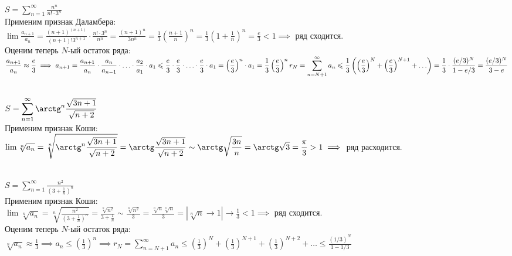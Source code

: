 \documentclass[a4paper]{article}
\begin{document}
    \begin{problem}
        \ \\
        $\displaystyle
        S = \sum\limits_{n=1}^{\infty}\frac{n^n}{n!\cdot3^n}$\\[3pt]
        Применим признак Даламбера:\\[3pt]
        $\displaystyle\lim\frac{a_{n + 1}}{a_n} = \frac{(n+1)^{(n+1)}}{(n+1)!3^{n+1}} \cdot \frac{n!\cdot3^n}{n^n} = \frac{(n+1)^{n}}{3n^n} =
        \frac{1}{3}\left(\frac{n + 1}{n}\right)^n =\frac{1}{3}\left(1+\frac{1}{n}\right)^n = \frac{e}{3} < 1 \implies
        $ ряд сходится.\\[3pt]
        Оценим теперь $N$-ый остаток ряда:\\[3pt]
        $\displaystyle
        \frac{a_{n + 1}}{a_n} \approx \frac{e}{3} \implies a_{n+1} =
        \frac{a_{n+1}}{a_n}\cdot\frac{a_{n}}{a_{n-1}}\cdot\ldots\cdot\frac{a_{2}}{a_1}\cdot a_1
        \leq \frac{e}{3}\cdot\frac{e}{3}\cdot\ldots\cdot\frac{e}{3}\cdot a_1 = \left(\frac{e}{3}\right)^n\cdot a_1=
        \frac{1}{3}\left(\frac{e}{3}\right)^n\\[3pt]
        r_N=\sum_{n = N+1}^{\infty}a_n \leq
        \frac{1}{3}\left( \left(\frac{e}{3}\right)^{N} + \left(\frac{e}{3}\right)^{N+1} + \ldots\right)=
        \frac{1}{3}\cdot\frac{(e/3)^N}{1 - e/3} =\frac{(e/3)^N}{3 - e}
        $
    \end{problem}
    \begin{problem}
        \ \\
        $\displaystyle
        S = \sum\limits_{n=1}^{\infty}\arctg^n\frac{\sqrt{3n+1}}{\sqrt{n+2}}$\\[3pt]
        Применим признак Коши:\\[3pt]
        $\displaystyle\lim\sqrt[n]{a_n} = \sqrt[n]{\arctg^n\frac{\sqrt{3n+1}}{\sqrt{n+2}}} =
        \arctg\frac{\sqrt{3n+1}}{\sqrt{n+2}} \sim\arctg\sqrt{\frac{3n}{n}} =
        \arctg\sqrt{3}=\frac{\pi}{3} > 1 \implies
        $ ряд расходится.
    \end{problem}
    \begin{problem}
        \ \\
        $\displaystyle
        S = \sum\limits_{n=1}^{\infty}\frac{n^2}{\left(3+\frac{1}{n}\right)^n}$\\[3pt]
        Применим признак Коши:\\[3pt]
        $\displaystyle\lim\sqrt[n]{a_n} = \sqrt[n]{\frac{n^2}{\left(3+\frac{1}{n}\right)^n}} = \frac{\sqrt[n]{n^2}}{3 + \frac{1}{n}} \sim\frac{\sqrt[n]{n^2}}{3} =\frac{\sqrt[n]{n}\sqrt[n]{n}}{3} =
        \left|\sqrt[n]{n}\to 1\right| \to \frac{1}{3} < 1 \implies
        $ ряд сходится.\\[3pt]
        Оценим теперь $N$-ый остаток ряда:\\[3pt]
        $\displaystyle
        \sqrt[n]{a_n} \approx \frac{1}{3} \implies a_n \leq \left(\frac{1}{3}\right)^n
        \implies r_N = \sum\limits_{n = N + 1}^{\infty} a_n \leq
        \left(\frac{1}{3}\right)^{N} + \left(\frac{1}{3}\right)^{N + 1} + \left(\frac{1}{3}\right)^{N+2} + \ldots
        \leq\frac{(1/3)^N}{1 - 1/3}
        $
    \end{problem}
\end{document}
